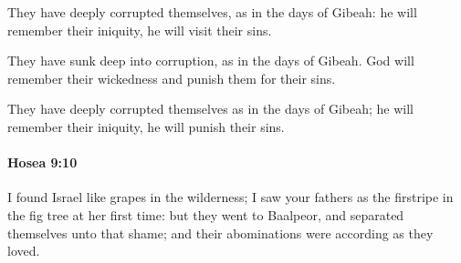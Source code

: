 			\begin{versebox}
					\item[BHS] 
					\item[LXX] 
					\item[ASV] They have deeply corrupted themselves, as in the days of Gibeah: he will remember their iniquity, he will visit their sins.
					\item[NIV] They have sunk deep into corruption, as in the days of Gibeah. God will remember their wickedness and punish them for their sins.
					\item[NRSV] They have deeply corrupted themselves as in the days of Gibeah; he will remember their iniquity, he will punish their sins.
			\end{versebox}

		\paragraph{Hosea 9:10} %
			\label{HOSEA-9-10}

			I found Israel like grapes in the wilderness; I saw your fathers as the firstripe in the fig tree at her first time: but they went to Baalpeor, and separated themselves unto that shame; and their abominations were according as they loved.

